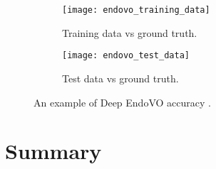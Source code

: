 \documentclass[thesis.tex]{subfiles}
\begin{document}
\begin{figure}[h] %
  \centering
  \begin{subfigure}[b]{0.4\linewidth}
    \centering
    \texttt{[image: endovo\_training\_data]}
    \caption{Training data vs ground truth.}
    \label{fig:endovo_training_data}
  \end{subfigure}
  \quad
  \begin{subfigure}[b]{0.4\linewidth}
    \centering
    \texttt{[image: endovo\_test\_data]}
    \caption{Test data vs ground truth.}
    \label{fig:endovo_test_data}
  \end{subfigure}
  \caption[An example of Deep EndoVO accuracy]{An example of Deep EndoVO accuracy \cite{DeepEndoVO18}.}
  \label{fig:deep_endovo_example}
\end{figure}



\section{Summary} \label{sec:C2-summary}
\end{document}
